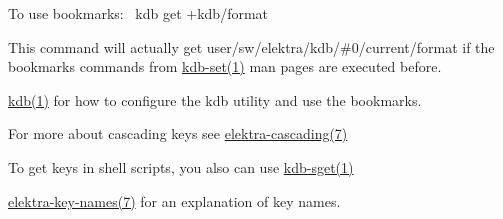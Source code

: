 To use bookmarks\+:~\newline
 {\ttfamily kdb get +kdb/format}

This command will actually get {\ttfamily user/sw/elektra/kdb/\#0/current/format} if the bookmarks commands from \mbox{\hyperlink{doc_help_kdb-set_md}{kdb-\/set(1)}} man pages are executed before.


\begin{DoxyItemize}
\item \mbox{\hyperlink{doc_help_kdb_md}{kdb(1)}} for how to configure the kdb utility and use the bookmarks.
\item For more about cascading keys see \mbox{\hyperlink{doc_help_elektra-cascading_md}{elektra-\/cascading(7)}}
\item To get keys in shell scripts, you also can use \mbox{\hyperlink{doc_help_kdb-sget_md}{kdb-\/sget(1)}}
\item \mbox{\hyperlink{doc_help_elektra-key-names_md}{elektra-\/key-\/names(7)}} for an explanation of key names. 
\end{DoxyItemize}